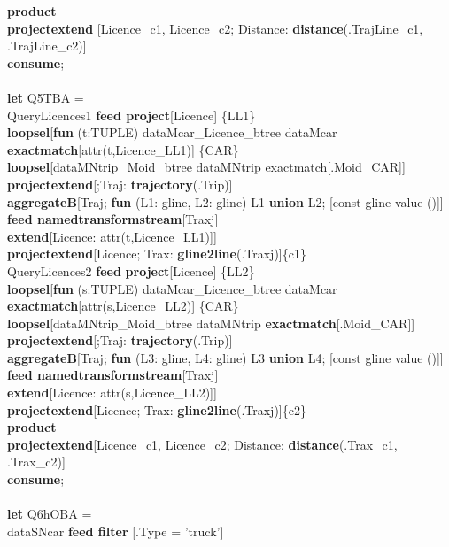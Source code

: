 \documentclass[a4paper]{article}
\newcommand{\op}[1]{\textbf{#1}}
\begin{document}
\begin{scriptsize}
\begin{tabbing}
\>\op{product}\\
\>\op{projectextend} [Licence\_c1, Licence\_c2; Distance: \op{distance}(.TrajLine\_c1, .TrajLine\_c2)]\\
\op{consume};\\
\\
\op{let} Q5TBA =\\
\>QueryLicences1 \op{feed project}[Licence] \{LL1\}\\
\>\>\op{loopsel}[\op{fun} (t:TUPLE) dataMcar\_Licence\_btree dataMcar \op{exactmatch}[attr(t,Licence\_LL1)] \{CAR\}\\
\>\>\>\op{loopsel}[dataMNtrip\_Moid\_btree dataMNtrip exactmatch[.Moid\_CAR]]\\
\>\>\>\op{projectextend}[;Traj: \op{trajectory}(.Trip)]\\
\>\>\>\op{aggregateB}[Traj; \op{fun} (L1: gline, L2: gline) L1 \op{union} L2; [const gline value ()]]\\
\>\>\>\op{feed namedtransformstream}[Traxj]\\
\>\>\>\op{extend}[Licence: attr(t,Licence\_LL1)]]\\
\>\>\op{projectextend}[Licence; Trax: \op{gline2line}(.Traxj)]\{c1\}\\
\>QueryLicences2 \op{feed} \op{project}[Licence] \{LL2\}\\
\>\>\op{loopsel}[\op{fun} (s:TUPLE) dataMcar\_Licence\_btree dataMcar \op{exactmatch}[attr(s,Licence\_LL2)] \{CAR\}\\
\>\>\>\op{loopsel}[dataMNtrip\_Moid\_btree dataMNtrip \op{exactmatch}[.Moid\_CAR]]\\
\>\>\>\op{projectextend}[;Traj: \op{trajectory}(.Trip)]\\
\>\>\>\op{aggregateB}[Traj; \op{fun} (L3: gline, L4: gline) L3 \op{union} L4; [const gline value ()]]\\
\>\>\>\op{feed namedtransformstream}[Traxj]\\
\>\>\>\op{extend}[Licence: attr(s,Licence\_LL2)]]\\
\>\>\op{projectextend}[Licence; Trax: \op{gline2line}(.Traxj)]\{c2\}\\
\>\op{product}\\
\>\op{projectextend}[Licence\_c1, Licence\_c2; Distance: \op{distance}(.Trax\_c1, .Trax\_c2)]\\
\op{consume};\\
\\
\op{let} Q6hOBA =\\
\>dataSNcar \op{feed filter} [.Type = 'truck']\\

\end{tabbing}
\end{scriptsize}
\end{document}
